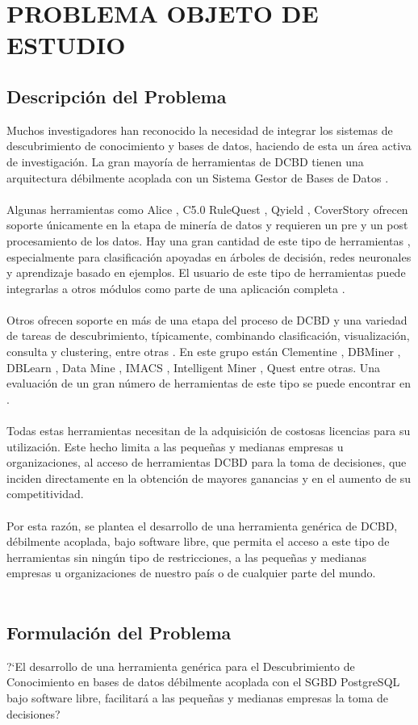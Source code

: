 \chapter{PROBLEMA OBJETO DE ESTUDIO}
\section{Descripci\'on del Problema}
Muchos investigadores \cite{7, 6, 17, 28} han reconocido la necesidad de integrar los sistemas de descubrimiento de conocimiento y bases de datos, haciendo de esta un \'area activa de investigaci\'on. La gran mayor\'ia de herramientas de DCBD tienen una arquitectura d\'ebilmente acoplada con un Sistema Gestor de Bases de Datos \cite{30}.\\
\\
Algunas herramientas como Alice \cite{20}, C5.0 RuleQuest \cite{27}, Qyield \cite{24},  Cover\-Story \cite{22} ofrecen soporte \'unicamente en la etapa de miner\'ia de datos y requieren un pre y un post procesamiento de los datos. Hay una gran cantidad de este tipo de herramientas \cite{21}, especialmente para clasificaci\'on apoyadas en \'arboles de decisi\'on, redes neuronales y aprendizaje basado en ejemplos. El usuario de este tipo de herramientas puede integrarlas  a otros m\'odulos como parte de una aplicaci\'on completa \cite{23}.\\
\\
Otros ofrecen soporte en  m\'as de una etapa del proceso de DCBD  y una variedad de tareas de descubrimiento, t\'ipicamente, combinando clasificaci\'on, visualizaci\'on, consulta y clustering, entre otras \cite{23}. En este grupo est\'an Clementine \cite{29}, DBMiner \cite{11, 12, 13}, DBLearn \cite{14}, Data Mine \cite{19}, IMACS \cite{5}, Intelligent Miner \cite{18}, Quest \cite{2} entre otras. Una evaluaci\'on de un gran n\'umero de herramientas de este  tipo se puede encontrar en \cite{10}.\\
\\
Todas estas herramientas necesitan de la adquisici\'on de costosas licencias para su utilizaci\'on. Este hecho limita a las peque\~nas y medianas empresas u organizaciones, al acceso de herramientas DCBD para la toma de decisiones, que inciden directamente en la obtenci\'on de mayores ganancias y en el aumento de su competitividad.\\
\\
Por esta raz\'on, se plantea el desarrollo de una herramienta gen\'erica de DCBD, d\'ebilmente acoplada, bajo software libre, que permita el acceso a este tipo de herramientas sin ning\'un tipo de restricciones, a las peque\~nas y medianas  empresas u organizaciones de nuestro pa\'is o de cualquier parte del mundo.\\
\\
\section{Formulaci\'on del Problema}
?`El desarrollo de una herramienta gen\'erica para el Descubrimiento de Conocimiento en bases de datos d\'ebilmente acoplada con el SGBD PostgreSQL bajo software libre, facilitar\'a a las peque\~nas y medianas empresas la toma de decisiones?
